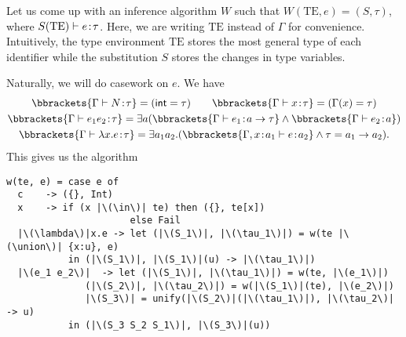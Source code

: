 \documentclass[class=scrartcl]{standalone}
\begin{document}
Let us come up with an inference algorithm \(W\) such that
\(W(\textrm{TE}, e) = (S, \tau)\), where \(S(\textrm{TE}) \vdash e {\hspace{0.1111em}:\hspace{0.1111em}} \tau\).
Here, we are writing \(\textrm{TE}\) instead of \(\Gamma\) for convenience.
Intuitively, the type environment \(\textrm{TE}\) stores
  the most general type of each identifier while
the substitution \(S\) stores the changes in type variables.

Naturally, we will do casework on \(e\). We have
\begin{gather*}
  \bbrackets{\Gamma \vdash N \of \tau} = (\pint = \tau) \qquad
    \bbrackets{\Gamma \vdash x \of \tau} = (\Gamma(x) = \tau) \\
  \bbrackets{\Gamma \vdash e_1 e_2 \of \tau}
    = \exists a (\bbrackets{\Gamma \vdash e_1 \of a \to \tau} \land
                 \bbrackets{\Gamma \vdash e_2 \of a}) \\
  \bbrackets{\Gamma \vdash \lambda x. e \of \tau}
    = \exists a_1 a_2. (\bbrackets{\Gamma, x \of a_1 \vdash e \of a_2} \land
                         \tau = a_1 \to a_2).
\end{gather*}
This gives us the algorithm
\begin{verbatim}
w(te, e) = case e of
  c    -> ({}, Int)
  x    -> if (x |\(\in\)| te) then ({}, te[x])
                      else Fail
  |\(\lambda\)|x.e -> let (|\(S_1\)|, |\(\tau_1\)|) = w(te |\(\union\)| {x:u}, e)
           in (|\(S_1\)|, |\(S_1\)|(u) -> |\(\tau_1\)|)
  |\(e_1 e_2\)|  -> let (|\(S_1\)|, |\(\tau_1\)|) = w(te, |\(e_1\)|)
              (|\(S_2\)|, |\(\tau_2\)|) = w(|\(S_1\)|(te), |\(e_2\)|)
              |\(S_3\)| = unify(|\(S_2\)|(|\(\tau_1\)|), |\(\tau_2\)| -> u)
           in (|\(S_3 S_2 S_1\)|, |\(S_3\)|(u))
\end{verbatim}
\end{document}
